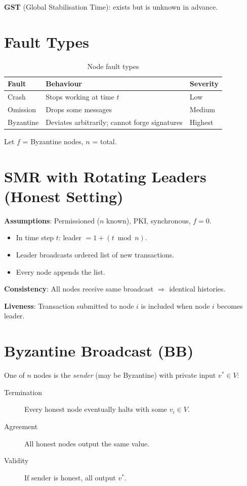 \documentclass[12pt,a4paper,openany]{book}
\theoremstyle{definition}
\theoremstyle{plain}
\theoremstyle{remark}
\begin{document}
\textbf{GST} (Global Stabilisation Time): exists but is unknown in advance.

\section{Fault Types}

\begin{table}[h]
\centering
\caption{Node fault types}
\begin{tabular}{lll}
\toprule
\textbf{Fault} & \textbf{Behaviour} & \textbf{Severity} \\
\midrule
Crash     & Stops working at time $t$ & Low \\
Omission  & Drops some messages & Medium \\
Byzantine & Deviates arbitrarily; cannot forge signatures & Highest \\
\bottomrule
\end{tabular}
\end{table}

Let $f$ = Byzantine nodes, $n$ = total.

\section{SMR with Rotating Leaders (Honest Setting)}

\textbf{Assumptions}: Permissioned ($n$ known), PKI, synchronous, $f=0$.

\begin{itemize}
  \item In time step $t$: leader $= 1+(t\bmod n)$.
  \item Leader broadcasts ordered list of new transactions.
  \item Every node appends the list.
\end{itemize}

\textbf{Consistency}: All nodes receive same broadcast $\Rightarrow$
identical histories.

\textbf{Liveness}: Transaction submitted to node $i$ is included when
node $i$ becomes leader.

\section{Byzantine Broadcast (BB)}

\begin{definitionbox}
  One of $n$ nodes is the \emph{sender} (may be Byzantine) with private
  input $v^*\in V$:
  \begin{description}
    \item[Termination] Every honest node eventually halts with some $v_i\in V$.
    \item[Agreement]   All honest nodes output the same value.
    \item[Validity]    If sender is honest, all output $v^*$.
  \end{description}
\end{definitionbox}
\end{document}
